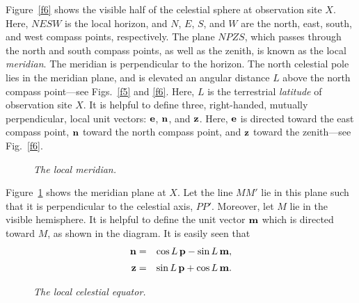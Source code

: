 Figure~\ref{f6} shows the visible half of the celestial sphere at observation site $X$. 
Here, $NESW$ is the local horizon, and  $N$, $E$, $S$, and $W$ are
the north, east, south, and west compass points, respectively. The plane $NPZS$,
which passes through the north and south compass points, as well as the zenith,
is known as the local {\em meridian}. The meridian is perpendicular
to the horizon. The north celestial pole lies in the meridian plane, and
is elevated an angular distance $L$ above the north compass point---see Figs.~\ref{f5} and \ref{f6}. Here,
$L$ is the terrestrial {\em latitude}\/ of observation site $X$. It is helpful to
define three, right-handed, mutually perpendicular,  local unit vectors: ${\bf e}$, ${\bf n}$, and ${\bf z}$.
Here, 
${\bf e}$ is directed toward the east compass point, ${\bf n}$ toward the north compass point, and ${\bf z}$  toward the zenith---see Fig.~\ref{f6}. 

\begin{figure}
\epsfysize=3in
\centerline{}
\caption[{\em The local meridian.}]{\em The local meridian.}\label{f7}
\end{figure}

Figure~\ref{f7} shows the meridian plane at $X$. Let the line $MM'$ lie
in this plane such that it is perpendicular to the celestial axis, $PP'$. Moreover, let
$M$ lie in the visible hemisphere. It is helpful to define the unit vector ${\bf m}$ which
is directed toward $M$, as shown in the diagram. It is easily seen that
\begin{eqnarray}\label{e14}
{\bf n} &=& \cos L\,{\bf p} - \sin L\,{\bf m},\\[0.5ex]
{\bf z} &=& \sin L\,{\bf p} + \cos L\,{\bf m}.\label{e15}
\end{eqnarray}

\begin{figure}
\epsfysize=3in
\centerline{}
\caption[{\em The local celestial equator.}]{\em The local celestial equator.}\label{f8}
\end{figure}

